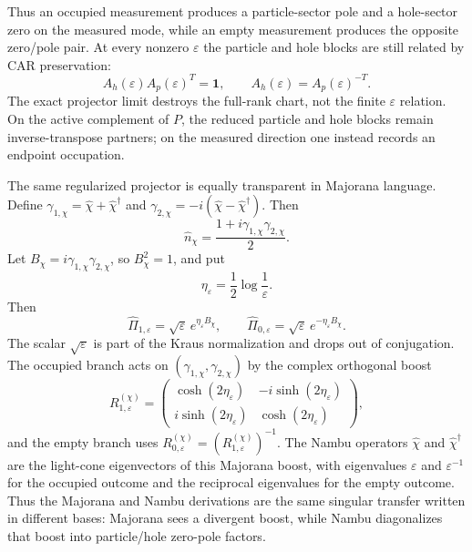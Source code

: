 \documentclass[aps,prb,onecolumn,nofootinbib,superscriptaddress]{revtex4-2}
\newcommand{\I}{\mathbf{1}}
\theoremstyle{plain}
\theoremstyle{definition}
\begin{document}
Thus an occupied measurement produces a particle-sector pole and a hole-sector
zero on the measured mode, while an empty measurement produces the opposite
zero/pole pair.  At every nonzero \(\varepsilon\) the particle and hole blocks
are still related by CAR preservation:
\begin{equation}
  A_h(\varepsilon)A_p(\varepsilon)^T=\I,
  \qquad
  A_h(\varepsilon)=A_p(\varepsilon)^{-T}.
  \label{eq:finite-epsilon-particle-hole-inverse}
\end{equation}
The exact projector limit destroys the full-rank chart, not the finite
\(\varepsilon\) relation.  On the active complement of \(P\), the reduced
particle and hole blocks remain inverse-transpose partners; on the measured
direction one instead records an endpoint occupation.

The same regularized projector is equally transparent in Majorana language.
Define
\(\gamma_{1,\chi}=\hat\chi+\hat\chi^\dagger\) and
\(\gamma_{2,\chi}=-i(\hat\chi-\hat\chi^\dagger)\).  Then
\begin{equation}
  \hat n_\chi=\frac{1+i\gamma_{1,\chi}\gamma_{2,\chi}}{2}.
  \label{eq:number-projector-majoranas}
\end{equation}
Let \(B_\chi=i\gamma_{1,\chi}\gamma_{2,\chi}\), so \(B_\chi^2=1\), and put
\begin{equation}
  \eta_\varepsilon=\frac{1}{2}\log\frac{1}{\varepsilon}.
  \label{eq:projector-boost-eta}
\end{equation}
Then
\begin{equation}
  \hat\Pi_{1,\varepsilon}
  =
  \sqrt{\varepsilon}\,e^{\eta_\varepsilon B_\chi},
  \qquad
  \hat\Pi_{0,\varepsilon}
  =
  \sqrt{\varepsilon}\,e^{-\eta_\varepsilon B_\chi}.
  \label{eq:projector-majorana-boost}
\end{equation}
The scalar \(\sqrt{\varepsilon}\) is part of the Kraus normalization and drops
out of conjugation.  The occupied branch acts on
\((\gamma_{1,\chi},\gamma_{2,\chi})\) by the complex orthogonal boost
\begin{equation}
  R_{1,\varepsilon}^{(\chi)}
  =
  \begin{pmatrix}
    \cosh(2\eta_\varepsilon)&-i\sinh(2\eta_\varepsilon)\\
    i\sinh(2\eta_\varepsilon)&\cosh(2\eta_\varepsilon)
  \end{pmatrix},
  \label{eq:occupied-projector-majorana-boost}
\end{equation}
and the empty branch uses \(R_{0,\varepsilon}^{(\chi)}
=(R_{1,\varepsilon}^{(\chi)})^{-1}\).  The Nambu operators
\(\hat\chi\) and \(\hat\chi^\dagger\) are the light-cone eigenvectors of this
Majorana boost, with eigenvalues \(\varepsilon\) and
\(\varepsilon^{-1}\) for the occupied outcome and the reciprocal eigenvalues
for the empty outcome.  Thus the Majorana and Nambu derivations are the same
singular transfer written in different bases: Majorana sees a divergent boost,
while Nambu diagonalizes that boost into particle/hole zero-pole factors.
\end{document}
